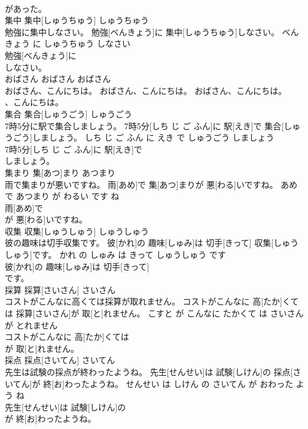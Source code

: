 \documentclass[8pt]{extreport}
\begin{document}
\begin{CJK}{UTF8}{min}
\\	があった。			
\\	集中	集中[しゅうちゅう]	しゅうちゅう	
\\	勉強に集中しなさい。	勉強[べんきょう]に 集中[しゅうちゅう]しなさい。	べんきょう に しゅうちゅう しなさい	
\\	勉強[べんきょう]に
\\	しなさい。			
\\	おばさん	おばさん	おばさん	
\\	おばさん、こんにちは。	おばさん、こんにちは。	おばさん、こんにちは。	
\\	、こんにちは。			
\\	集合	集合[しゅうごう]	しゅうごう	
\\	7時5分に駅で集合しましょう。	7時5分[しち じ ご ふん]に 駅[えき]で 集合[しゅうごう]しましょう。	しち じ ご ふん に えき で しゅうごう しましょう	
\\	7時5分[しち じ ご ふん]に 駅[えき]で
\\	しましょう。			
\\	集まり	集[あつ]まり	あつまり	
\\	雨で集まりが悪いですね。	雨[あめ]で 集[あつ]まりが 悪[わる]いですね。	あめ で あつまり が わるい です ね	
\\	雨[あめ]で
\\	が 悪[わる]いですね。			
\\	収集	収集[しゅうしゅう]	しゅうしゅう	
\\	彼の趣味は切手収集です。	彼[かれ]の 趣味[しゅみ]は 切手[きって] 収集[しゅうしゅう]です。	かれ の しゅみ は きって しゅうしゅう です	
\\	彼[かれ]の 趣味[しゅみ]は 切手[きって]
\\	です。			
\\	採算	採算[さいさん]	さいさん	
\\	コストがこんなに高くては採算が取れません。	コストがこんなに 高[たか]くては 採算[さいさん]が 取[と]れません。	こすと が こんなに たかくて は さいさん が とれません	
\\	コストがこんなに 高[たか]くては
\\	が 取[と]れません。			
\\	採点	採点[さいてん]	さいてん	
\\	先生は試験の採点が終わったようね。	先生[せんせい]は 試験[しけん]の 採点[さいてん]が 終[お]わったようね。	せんせい は しけん の さいてん が おわった よう ね	
\\	先生[せんせい]は 試験[しけん]の
\\	が 終[お]わったようね。			

\end{CJK}
\end{document}
